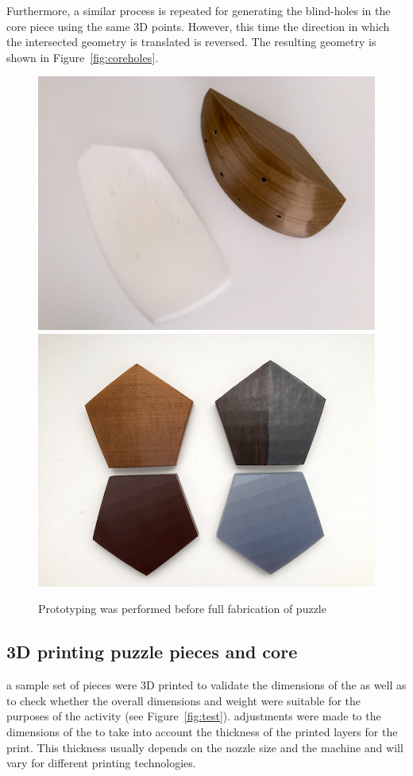 \documentclass[acmlarge,screen,dvipsnames]{acmart}
\begin{document}
Furthermore, a similar process is repeated for generating the
blind-holes in the  core piece using the same 3D points. However, this
time the direction in which the intersected geometry is translated is
reversed. The resulting geometry is shown in
Figure~\ref{fig:coreholes}. %

\begin{figure}[H]
  \centering
  {\includegraphics[width=0.45\linewidth]{images/coreANDpiece}}
   {\includegraphics[width=0.45\linewidth]{images/colour}}

  \caption{
    Prototyping was performed before full fabrication of puzzle}
\end{figure}


\subsection{3D printing puzzle pieces and core}
 a sample set of pieces were 3D
printed to validate the dimensions of the  as well as to check
whether the overall dimensions and weight were suitable for the
purposes of the activity (see Figure~\ref{fig:test}). 
adjustments were made to the dimensions of the  to take into
account  the thickness of the printed layers for the print. This
thickness usually depends on the nozzle size and the machine and will
vary for different printing technologies.
%
\end{document}
